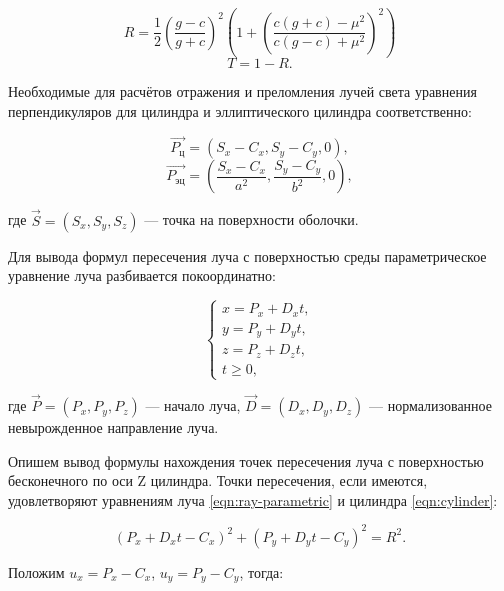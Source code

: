 \begin{equation}
	R = \frac12 \left(\frac{g-c}{g+c}\right)^2 \left(1 + \left(\frac{c(g + c) - \mu^2}{c(g - c) + \mu^2}\right)^2\right)
\end{equation}
\begin{equation}
	\label{eqn:refraction-end}
	T = 1 - R.
\end{equation}

Необходимые для расчётов отражения и преломления лучей света уравнения перпендикуляров для цилиндра и эллиптического цилиндра соответственно:

\begin{equation}
	\label{eqn:perpendicular-cylinder}
	\overrightarrow{P_{\text{ц}}} = (S_x - C_x, S_y - C_y, 0),
\end{equation}
\begin{equation}
	\label{eqn:perpendicular-elliptic-cylinder}
	\overrightarrow{P_{\text{эц}}} = \left(\frac{S_x - C_x}{a^2}, \frac{S_y - C_y}{b^2}, 0\right),
\end{equation}

\noindent где $\vec S = \left(S_x, S_y, S_z\right)$ — точка на поверхности оболочки.

Для вывода формул пересечения луча с поверхностью среды параметрическое уравнение луча разбивается покоординатно:

\begin{equation}
	\label{eqn:ray-parametric}
	\begin{cases}
		x = P_x + D_x t, \\
		y = P_y + D_y t, \\
		z = P_z + D_z t, \\
		t \geqslant 0,
	\end{cases}
\end{equation}

\noindent где $\vec P = (P_x, P_y, P_z)$ — начало луча, $\vec D = (D_x, D_y, D_z)$ — нормализованное невырожденное направление луча.

Опишем вывод формулы нахождения точек пересечения луча с поверхностью бесконечного по оси Z цилиндра. Точки пересечения, если имеются, удовлетворяют уравнениям луча \eqref{eqn:ray-parametric} и цилиндра \eqref{eqn:cylinder}:

\begin{equation}
	\label{eqn:cylinder-solve-begin}
	(P_x + D_x t - C_x)^2 + (P_y + D_y t - C_y)^2 = R^2.
\end{equation}

\noindent Положим $u_x = P_x - C_x$, $u_y = P_y - C_y$, тогда:

